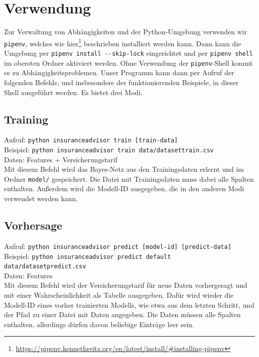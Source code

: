 \section{Verwendung}
Zur Verwaltung von Abhängigkeiten und der Python-Umgebung verwenden wir \texttt{pipenv}, welches wie hier\footnote{\url{https://pipenv.kennethreitz.org/en/latest/install/#installing-pipenv}} beschrieben installiert werden kann. Dann kann die Umgebung per \texttt{pipenv install -{}-skip-lock} eingerichtet und per \texttt{pipenv shell} im obersten Ordner aktiviert werden. Ohne Verwendung der \texttt{pipenv}-Shell kommt es zu Abhängigkeitsproblemen. Unser Programm kann dann per Aufruf der folgenden Befehle, und insbesondere der funktionierenden Beispiele, in dieser Shell ausgeführt werden. Es bietet drei Modi.

\subsection{Training}
Aufruf: \texttt{python insurance\textunderscore advisor train [train-data]} \\
Beispiel: \texttt{python insurance\textunderscore advisor train data/dataset\textunderscore train.csv} \\
Daten: Features + Versicherungstarif \\
Mit diesem Befehl wird das Bayes-Netz aus den Trainingsdaten erlernt und im Ordner \texttt{model/} gespeichert. Die Datei mit Trainingsdaten muss dabei alle Spalten enthalten. Außerdem wird die Modell-ID ausgegeben, die in den anderen Modi verwendet werden kann.

\subsection{Vorhersage}
Aufruf: \texttt{python insurance\textunderscore advisor predict [model-id] [predict-data]} \\
Beispiel: \texttt{python insurance\textunderscore advisor predict default data/dataset\textunderscore predict.csv} \\
Daten: Features \\
Mit diesem Befehl wird der Versicherungstarif für neue Daten vorhergesagt und mit einer Wahrscheinlichkeit als Tabelle ausgegeben. Dafür wird wieder die Modell-ID eines vorher trainierten Modells, wie etwa aus dem letzten Schritt, und der Pfad zu einer Datei mit Daten angegeben. Die Daten müssen alle Spalten enthalten, allerdings dürfen davon beliebige Einträge leer sein.

